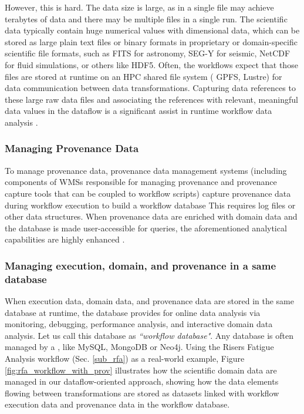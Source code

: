 However, this is hard. The data size is large, as in a single file may achieve terabytes of data and there may be multiple files in a single run. The scientific data typically contain huge numerical values with dimensional data, which can be stored as large plain text files or binary formats in proprietary or domain-specific scientific file formats, such as FITS for astronomy, SEG-Y for seismic,
NetCDF for fluid simulations, or others like
HDF5.
Often, the workflows expect that those files are
stored at runtime on an HPC shared file system (\eg{} GPFS,
Lustre) for data communication between data transformations.
Capturing data references to
these large raw data files and associating the references with relevant, meaningful data values in the dataflow is a significant assist in runtime workflow data analysis
\cite{Silva2017Raw}.

\subsubsection{Managing Provenance Data}

To manage provenance data, provenance data management systems (including components of WMSs responsible for managing provenance and provenance capture tools that can be coupled to workflow scripts) capture provenance
data during workflow execution to build a workflow database
This requires log files or other data structures. When provenance data are enriched with domain data and the
database is made user-accessible for queries, the aforementioned
analytical capabilities are highly enhanced
\cite{Ogasawara2011algebraic,Souza2015Parallel,Silva2017Raw,DeOliveira2015How}.

\subsubsection{Managing execution, domain, and provenance in a same database}
\label{subsec_wfdb}

When execution data, domain data, and provenance data are stored in the
same database at runtime, the database provides for online data analysis via monitoring, debugging, performance analysis, and interactive domain data analysis. Let us call this database as \textit{``workflow database"}. Any database is often managed
by a , like MySQL, MongoDB or Neo4j. Using the Risers Fatigue Analysis workflow (Sec. \ref{sub_rfa}) as a real-world example, Figure \ref{fig:rfa_workflow_with_prov}  illustrates how the scientific domain data are managed in our dataflow-oriented approach, showing how the data elements flowing between transformations are stored as datasets linked with workflow execution data and provenance data in the workflow database.

